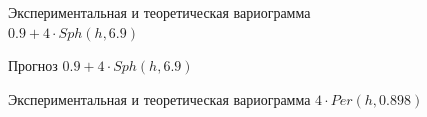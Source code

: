 \begin{figure}[H]
\caption{Экспериментальная и теоретическая вариограмма $ 0.9 + 4 \cdot Sph(h, 6.9) $}
\label{img:sph-adapt-modeled}
\end{figure}

\begin{figure}[H]
\caption{Прогноз $ 0.9 + 4 \cdot Sph(h, 6.9) $}
\label{img:sph-adapt-pred}
\end{figure}

\begin{figure}[H]
\caption{Экспериментальная и теоретическая вариограмма $ 4 \cdot Per(h, 0.898) $}
\label{img:per-cv-modeled}
\end{figure}

